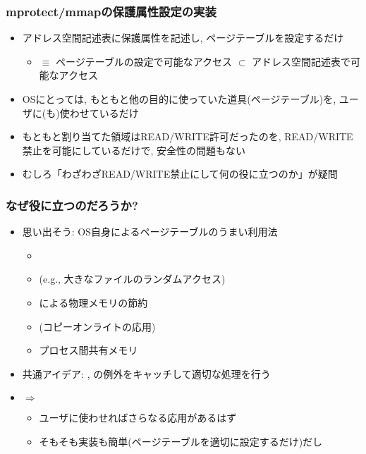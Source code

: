 \documentclass[12pt,dvipdfmx]{beamer}
\begin{document}
\begin{frame}
  \frametitle{mprotect/mmapの保護属性設定の実装}
  \begin{itemize}
  \item アドレス空間記述表に保護属性を記述し,
    ページテーブルを設定するだけ
    \begin{itemize}
    \item {} $\equiv$
      ページテーブルの設定で可能なアクセス $\subset$
      アドレス空間記述表で可能なアクセス
    \end{itemize}
  \item OSにとっては, もともと他の目的に使っていた道具(ページテーブル)を,
    ユーザに(も)使わせているだけ
  \item もともと割り当てた領域はREAD/WRITE許可だったのを,
    READ/WRITE禁止を可能にしているだけで, 安全性の問題もない
  \item むしろ「わざわざREAD/WRITE禁止にして何の役に立つのか」が疑問
  \end{itemize}
\end{frame}

\begin{frame}
  \frametitle{なぜ役に立つのだろうか?}
  \begin{itemize}
  \item 思い出そう: OS自身によるページテーブルのうまい利用法
    \begin{itemize}
    \item {}
    \item {} (e.g., 大きなファイルのランダムアクセス)
    \item {}による物理メモリの節約
    \item {}(コピーオンライトの応用)
    \item プロセス間共有メモリ
    \end{itemize}
  \item 共通アイデア: ,
    の例外をキャッチして適切な処理を行う
  \item $\Rightarrow$
    \begin{itemize}
    \item ユーザに使わせればさらなる応用があるはず
    \item そもそも実装も簡単(ページテーブルを適切に設定するだけ)だし
    \end{itemize}
  \end{itemize}
\end{frame}
\end{document}
